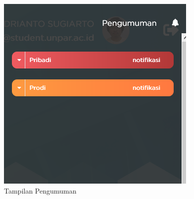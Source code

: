 \begin{enumerate}
	\begin{figure}[H]
		\centering
		\includegraphics[scale=0.75]{Gambar/studentportal_pengumuman}
		\caption{Tampilan Pengumuman}
		\label{fig:studentportal_pengumuman}
	\end{figure}
\end{enumerate}
